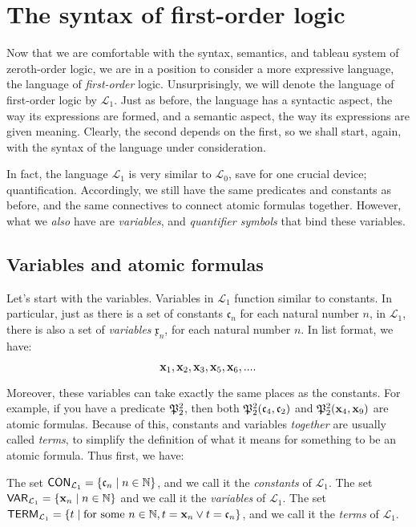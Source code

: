 \chapter{The syntax of first-order logic}

Now that we are comfortable with the syntax, semantics, and tableau system of zeroth-order logic, we are in a position to consider a more expressive language, the language of \textit{first-order} logic. Unsurprisingly, we will denote the language of first-order logic by $\mathcal{L}_1$. Just as before, the language has a syntactic aspect, the way its expressions are formed, and a semantic aspect, the way its expressions are given meaning. Clearly, the second depends on the first, so we shall start, again, with the syntax of the language under consideration. 

In fact, the language $\mathcal{L}_1$ is very similar to $\mathcal{L}_0$, save for one crucial device; quantification. Accordingly, we still have the same predicates and constants as before, and the same connectives to connect atomic formulas together. However, what we \textit{also} have are \textit{variables}, and \textit{quantifier symbols} that bind these variables. 

\section{Variables and atomic formulas}

Let's start with the variables. Variables in $\mathcal{L}_1$ function similar to constants. In particular, just as there is a set of constants $\mathfrak{c}_n$ for each natural number $n$, in $\mathcal{L}_1$, there is also a set of \textit{variables} $\mathfrak{x}_n$, for each natural number $n$. In list format, we have:

\[
\mathbf{x}_{1}, \mathbf{x}_{2}, \mathbf{x}_{3}, \mathbf{x}_{5}, \mathbf{x}_{6}, ....
\]


Moreover, these variables can take exactly the same places as the constants. For example, if you have a predicate $\mathfrak{P}^{2}_{2}$, then both $\mathfrak{P}^{2}_{2}(\mathfrak{c}_{4}, \mathfrak{c}_{2})$ and $\mathfrak{P}^{2}_{2}(\mathbf{x}_{4}, \mathbf{x}_{9})$ are atomic formulas. Because of this, constants and variables \textit{together} are usually called \textit{terms}, to simplify the definition of what it means for something to be an atomic formula. Thus first, we have:

\begin{defn}
The set $\mathsf{CON}_{\mathcal{L}_1}=\{\mathfrak{c}_{n} \mid n \in \mathbb{N}\}$, and we call it the \textit{constants} of $\mathcal{L}_1$. The set $\mathsf{VAR}_{\mathcal{L}_1}=\{\mathbf{x}_{n} \mid n \in \mathbb{N}\}$ and we call it the \textit{variables} of $\mathcal{L}_1$. The set $\mathsf{TERM}_{\mathcal{L}_1}=\{t \mid \text{for some } n\in \mathbb{N}, t = \mathbf{x}_{n} \vee t = \mathfrak{c}_{n} \}$, and we call it the \textit{terms} of $\mathcal{L}_1$. 
\end{defn}

